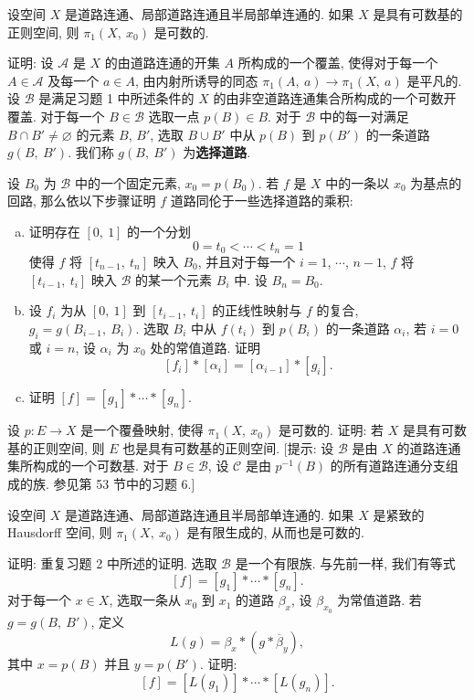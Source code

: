 \begin{exercise}
\label{exercise:ch13-extra-02}
\begin{theorem}[第二可数基下基本群可数]
设空间 $X$ 是道路连通、局部道路连通且半局部单连通的. 如果 $X$ 是具有可数基的正则空间, 则 $\pi_{1}(X,\ x_{0})$ 是可数的.
\end{theorem}
证明: 设 $\mathcal{A}$ 是 $X$ 的由道路连通的开集 $A$ 所构成的一个覆盖, 使得对于每一个 $A\in\mathcal{A}$ 及每一个 $a\in A$, 由内射所诱导的同态 $\pi_{1}(A,\ a)\to\pi_{1}(X,\ a)$ 是平凡的. 设 $\mathcal{B}$ 是满足习题 1 中所述条件的 $X$ 的由非空道路连通集合所构成的一个可数开覆盖. 对于每一个 $B\in\mathcal{B}$ 选取一点 $p(B)\in B$. 对于 $\mathcal{B}$ 中的每一对满足 $B\cap B'\neq\varnothing$ 的元素 $B$, $B'$, 选取 $B\cup B'$ 中从 $p(B)$ 到 $p(B')$ 的一条道路 $g(B,\ B')$. 我们称 $g(B,\ B')$ 为\textbf{选择道路}.

设 $B_{0}$ 为 $\mathcal{B}$ 中的一个固定元素, $x_{0}=p(B_{0})$. 若 $f$ 是 $X$ 中的一条以 $x_{0}$ 为基点的回路, 那么依以下步骤证明 $f$ 道路同伦于一些选择道路的乘积:
\begin{enumerate}[(a)]
\item 证明存在 $[0,\ 1]$ 的一个分划
\[
0=t_{0}<\cdots<t_{n}=1
\]
使得 $f$ 将 $[t_{n-1},\ t_{n}]$ 映入 $B_{0}$, 并且对于每一个 $i=1$, $\cdots$, $n-1$, $f$ 将 $[t_{i-1},\ t_{i}]$ 映入 $\mathcal{B}$ 的某一个元素 $B_{i}$ 中. 设 $B_{n}=B_{0}$.
\item 设 $f_{i}$ 为从 $[0,\ 1]$ 到 $[t_{i-1},\ t_{i}]$ 的正线性映射与 $f$ 的复合, $g_{i}=g(B_{i-1},\ B_{i})$. 选取 $B_{i}$ 中从 $f(t_{i})$ 到 $p(B_{i})$ 的一条道路 $\alpha_{i}$, 若 $i=0$ 或 $i=n$, 设 $\alpha_{i}$ 为 $x_{0}$ 处的常值道路. 证明
\[
[f_{i}]*[\alpha_{i}]=[\alpha_{i-1}]*[g_{i}].
\]
\item 证明 $[f]=[g_{1}]*\cdots*[g_{n}]$.
\end{enumerate}
\end{exercise}

\begin{exercise}
\label{exercise:ch13-extra-03}
设 $p\colon E\to X$ 是一个覆叠映射, 使得 $\pi_{1}(X,\ x_{0})$ 是可数的. 证明: 若 $X$ 是具有可数基的正则空间, 则 $E$ 也是具有可数基的正则空间. [提示: 设 $\mathcal{B}$ 是由 $X$ 的道路连通集所构成的一个可数基. 对于 $B\in\mathcal{B}$, 设 $\mathcal{C}$ 是由 $p^{-1}(B)$ 的所有道路连通分支组成的族. 参见第 53 节中的习题 6.]
\end{exercise}

\begin{exercise}
\label{exercise:ch13-extra-04}
\begin{theorem}[紧致空间的基本群有限生成]
设空间 $X$ 是道路连通、局部道路连通且半局部单连通的. 如果 $X$ 是紧致的 Hausdorff 空间, 则 $\pi_{1}(X,\ x_{0})$ 是有限生成的, 从而也是可数的.
\end{theorem}
证明: 重复习题 2 中所述的证明. 选取 $\mathcal{B}$ 是一个有限族. 与先前一样, 我们有等式
\[
[f]=[g_{1}]*\cdots*[g_{n}].
\]
对于每一个 $x\in X$, 选取一条从 $x_{0}$ 到 $x_{1}$ 的道路 $\beta_{x}$, 设 $\beta_{x_{0}}$ 为常值道路. 若 $g=g(B,\ B')$, 定义
\[
L(g)=\beta_{x}*(g*\overline{\beta}_{y}),
\]
其中 $x=p(B)$ 并且 $y=p(B')$. 证明:
\[
[f]=[L(g_{1})]*\cdots*[L(g_{n})].
\]
\end{exercise}

